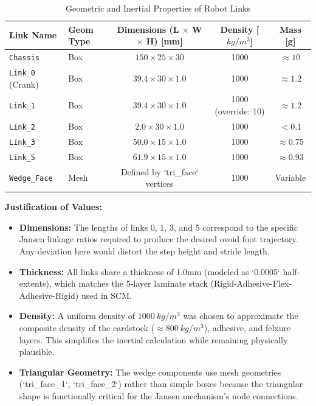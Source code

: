 \documentclass[11pt, a4paper]{article}
\begin{document}
\begin{table}[H]
    \centering
    \caption{Geometric and Inertial Properties of Robot Links}
    \label{tab:link-props}
    \begin{tabular}{llccc}
        \toprule
        \textbf{Link Name} & \textbf{Geom Type} & \textbf{Dimensions (L $\times$ W $\times$ H) [mm]} & \textbf{Density [$kg/m^3$]} & \textbf{Mass [g]} \\
        \midrule
        \texttt{Chassis} & Box & $150 \times 25 \times 30$ & 1000 & $\approx 10$ \\
        \texttt{Link\_0} (Crank) & Box & $39.4 \times 30 \times 1.0$ & 1000 & $\approx 1.2$ \\
        \texttt{Link\_1} & Box & $39.4 \times 30 \times 1.0$ & 1000 (override: 10) & $\approx 1.2$ \\
        \texttt{Link\_2} & Box & $2.0 \times 30 \times 1.0$ & 1000 & $<0.1$ \\
        \texttt{Link\_3} & Box & $50.0 \times 15 \times 1.0$ & 1000 & $\approx 0.75$ \\
        \texttt{Link\_5} & Box & $61.9 \times 15 \times 1.0$ & 1000 & $\approx 0.93$ \\
        \texttt{Wedge\_Face} & Mesh & Defined by `tri\_face` vertices & 1000 & Variable \\
        \bottomrule
    \end{tabular}
\end{table}

\textbf{Justification of Values:}
\begin{itemize}
    \item \textbf{Dimensions:} The lengths of links 0, 1, 3, and 5 correspond to the specific Jansen linkage ratios required to produce the desired ovoid foot trajectory. Any deviation here would distort the step height and stride length.
    \item \textbf{Thickness:} All links share a thickness of 1.0mm (modeled as `0.0005` half-extents), which matches the 5-layer laminate stack (Rigid-Adhesive-Flex-Adhesive-Rigid) used in SCM.
    \item \textbf{Density:} A uniform density of $1000~kg/m^3$ was chosen to approximate the composite density of the cardstock ($\approx 800~kg/m^3$), adhesive, and felxure layers. This simplifies the inertial calculation while remaining physically plausible.
    \item \textbf{Triangular Geometry:} The wedge components use mesh geometries (`tri\_face\_1`, `tri\_face\_2`) rather than simple boxes because the triangular shape is functionally critical for the Jansen mechanism's node connections.
\end{itemize}
\end{document}
